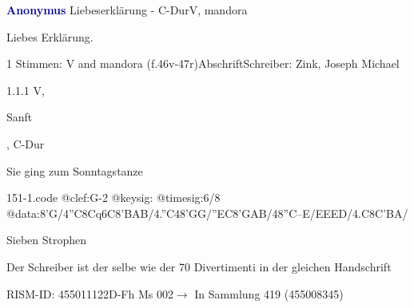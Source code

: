\documentclass[twocolumn]{book}
\begin{document}
\par \vspace{7pt} \textcolor{darkblue}{\textbf{Anonymus  }}\hfillplus{\textbf{[151]}}\newline Liebeserklärung - C-Dur\newline V, mandora
\par \begin{itshape}[heading, f.46v:] Liebes Erklärung.\end{itshape} 
\par \textcolor{darkblue}{}  1 Stimmen: V and mandora  (f.46v-47r)\newline Abschrift\newline Schreiber: Zink, Joseph Michael
\par 1.1.1  V, \begin{itshape}Sanft\end{itshape}, C-Dur\newline \begin{footnotesize} Sie ging zum Sonntagstanze \end{footnotesize}  
\begin{filecontents*}{151-1.code}
@clef:G-2
@keysig:
@timesig:6/8
@data:8'G/4''C8Cq6C{8'BA}B/4.''C48'GG/''EC{8'GA}B/48''C--E/EEED/4.C{8C'B}A/
\end{filecontents*}
\newline
%
\par Sieben Strophen
\par Der Schreiber ist der selbe wie der 70 Divertimenti in der gleichen Handschrift
\par RISM-ID: 455011122\newline D-Fh  Ms 002\newline $\rightarrow$ In Sammlung 419 (455008345)
      
\end{document}
